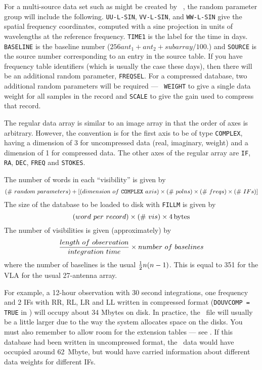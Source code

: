     For a multi-source data set such as might be created by {\tt
{}}, the random parameter group will include the following.
{\tt UU-L-SIN}, {\tt VV-L-SIN}, and {\tt WW-L-SIN} give the spatial
frequency coordinates, computed with a sine projection in units of
wavelengths at the reference frequency.  {\tt TIME1} is the label for
the time in days.   {\tt BASELINE} is the baseline number ($256 ant_1
+ ant_2 + subarray/100.$) and {\tt SOURCE} is the source number
corresponding to an entry in the source table.  If you have frequency table
identifiers (which is usually the case these days), then there will be
an additional random parameter, {\tt FREQSEL}\@.  For a compressed
database, two additional random parameters will be required --- {\tt
WEIGHT} to give a single data weight for all samples in the record and
{\tt SCALE} to give the gain used to compress that record.

   The regular data array is similar to an image array in that the
order of axes is arbitrary.  However, the convention is for the first
axis to be of type {\tt COMPLEX}, having a dimension of 3 for
uncompressed data (real, imaginary, weight) and a dimension of 1 for
compressed data.  The other axes of the regular array are {\tt IF},
{\tt RA}, {\tt DEC}, {\tt FREQ} and {\tt STOKES}.


The number of words in each ``visibility'' is given by
$$
 (\#~random~parameters)
   + \lbrack (dimension~of~\hbox{{\tt COMPLEX}}~axis)
   \times (\#~polns) \times (\#~freqs) \times (\#~IFs) \rbrack
$$
The size of the database to be loaded to disk with {\tt FILLM} is
given by
$$
   (word~per~record) \times (\#~vis) \times 4 \rm\,bytes
$$
The number of visibilities is given (approximately) by
$$
   {length~of~observation \over integration~time} \times
                                          number~of~baselines
$$
where the number of baselines is the usual ${1\over2}n(n-1)$.  This
is equal to 351 for the VLA for the usual 27-antenna array.

     For example, a 12-hour observation with 30 second integrations,
one frequency and 2 IFs with RR, RL, LR and LL written in compressed
format ({\tt DOUVCOMP = TRUE} in {\tt {}}) will occupy about
34 Mbytes on disk.  In practice, the \uv\ file will usually be a
little larger due to the way the system allocates space on the disks.
You must also remember to allow room for the extension tables --- see
.   If this database had been written in uncompressed format,
the \uv\ data would have occupied around 62~Mbyte, but would have
carried information about different data weights for different IFs.

